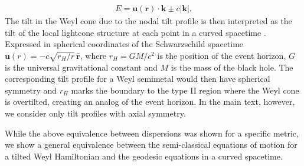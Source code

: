 \documentclass[submission, Phys]{SciPost}
\begin{document}
\begin{appendix}
\begin{align}
    E=\bm{u}(\bm r)\cdot\bm{k} \pm c|\bm k|.
    \label{eq:appDisp}
\end{align}
The tilt in the Weyl cone  due to the nodal tilt profile is then interpreted as the tilt of the local lightcone structure at each point in a curved spacetime \cite{Volovik2016}. Expressed in spherical coordinates of the Schwarzschild spacetime $\bm u (r)=-c\sqrt{r_H/r} \, \hat{\bm r}$, where $r_H=GM/c^2$ is the position of the event horizon, $G$ is the universal gravitational constant and $M$ is the mass of the black hole.
The corresponding tilt profile for a Weyl semimetal would then have spherical symmetry and $r_H$ marks the boundary to the type II region where the Weyl cone is overtilted, creating an analog of the event horizon. In the main text, however, we consider only tilt profiles with axial symmetry.


While the above equivalence between dispersions was shown for a specific metric, we show a general equivalence between the semi-classical equations of motion for a tilted Weyl Hamiltonian and the geodesic equations in a curved spacetime.
 

\end{appendix}
\end{document}
